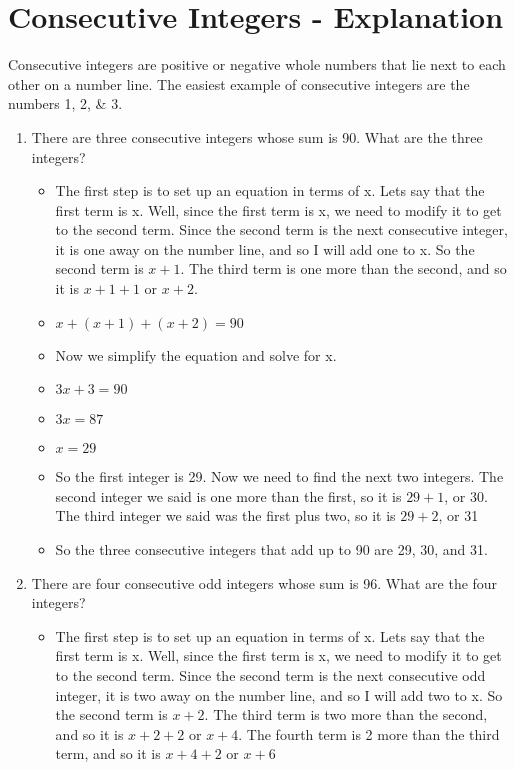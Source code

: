 \documentclass{article}
\begin{document}
\newpage
\section{Consecutive Integers - Explanation}
Consecutive integers are positive or negative whole numbers that lie next to each other on a number line. 
The easiest example of consecutive integers are the numbers 1, 2, \& 3.

\begin{enumerate}
\item There are three consecutive integers whose sum is 90. What are the three integers?
  \begin{itemize}
  \item The first step is to set up an equation in terms of x. Lets say that the first term is x. Well, since the first term is x, we need to modify it to get to the second term. Since the second term is the next consecutive integer, it is one away on the number line, and so I will add one to x. So the second term is $x+1$. The third term is one more than the second, and so it is $x+1+1$ or $x+2$.
  \item [] $x+(x+1)+(x+2)=90$
  \item Now we simplify the equation and solve for x.
  \item [] $3x+3=90$
  \item [] $3x=87$
  \item [] $x=29$
  \item So the first integer is 29. Now we need to find the next two integers. The second integer we said is one more than the first, so it is $29+1$, or 30. The third integer we said was the first plus two, so it is $29+2$, or 31
  \item So the three consecutive integers that add up to 90 are 29, 30, and 31.
  \end{itemize}
\item There are four consecutive odd integers whose sum is 96. What are the four integers?
  \begin{itemize}
  \item The first step is to set up an equation in terms of x. Lets say that the first term is x. Well, since the first term is x, we need to modify it to get to the second term. Since the second term is the next consecutive odd integer, it is two away on the number line, and so I will add two to x. So the second term is $x+2$. The third term is two more than the second, and so it is $x+2+2$ or $x+4$. The fourth term is 2 more than the third term, and so it is $x+4+2$ or $x+6$

\end{itemize}
\end{enumerate}
\end{document}
